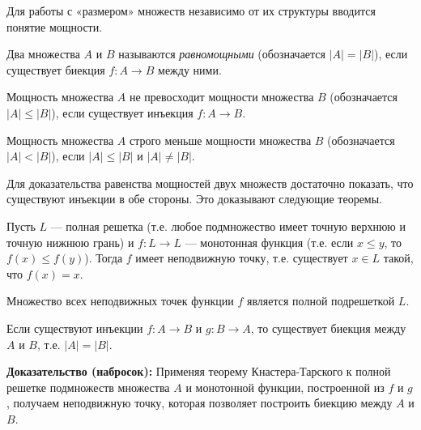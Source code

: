 \documentclass[11pt, a4paper]{extarticle}
\renewcommand{\le}{\leqslant}
\begin{document}
Для работы с «размером» множеств независимо от их структуры вводится понятие мощности.

\begin{definition}
Два множества $A$ и $B$ называются \textit{равномощными} (обозначается $|A| = |B|$), если существует биекция $f: A \to B$ между ними.
\end{definition}

\begin{definition}
Мощность множества $A$ не превосходит мощности множества $B$ (обозначается $|A| \le |B|$), если существует инъекция $f: A \to B$.

Мощность множества $A$ строго меньше мощности множества $B$ (обозначается $|A| < |B|$), если $|A| \le |B|$ и $|A| \neq |B|$.
\end{definition}

Для доказательства равенства мощностей двух множеств достаточно показать, что существуют инъекции в обе стороны. Это доказывают следующие теоремы.

\begin{theorem}
Пусть $L$ — полная решетка (т.е. любое подмножество имеет точную верхнюю и точную нижнюю грань) и $f: L \to L$ — монотонная функция (т.е. если $x \le y$, то $f(x) \le f(y)$). Тогда $f$ имеет неподвижную точку, т.е. существует $x \in L$ такой, что $f(x) = x$.

Множество всех неподвижных точек функции $f$ является полной подрешеткой $L$.
\end{theorem}

\begin{theorem}
Если существуют инъекции $f: A \to B$ и $g: B \to A$, то существует биекция между $A$ и $B$, т.е. $|A| = |B|$.

\textbf{Доказательство (набросок):} Применяя теорему Кнастера-Тарского к полной решетке подмножеств множества $A$ и монотонной функции, построенной из $f$ и $g$, получаем неподвижную точку, которая позволяет построить биекцию между $A$ и $B$.
\end{theorem}
\end{document}
